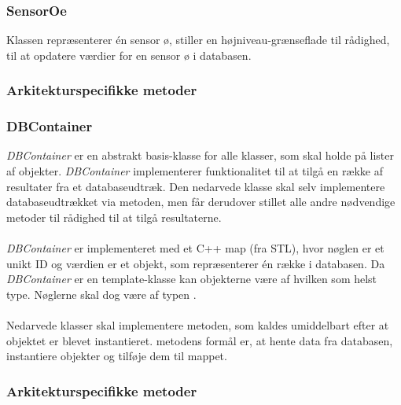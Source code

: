 \subsubsection{SensorOe}
Klassen repræsenterer én sensor ø, stiller en højniveau-grænseflade til rådighed, til at opdatere værdier for en sensor ø i databasen.

\subsubsection{Arkitekturspecifikke metoder}

{
}

{
}



\subsubsection{DBContainer}
\textit{DBContainer} er en abstrakt basis-klasse for alle klasser, som skal holde på lister af objekter. \textit{DBContainer} implementerer funktionalitet til at tilgå en række af resultater fra et databaseudtræk. Den nedarvede klasse skal selv implementere databaseudtrækket via  metoden, men får derudover stillet alle andre nødvendige metoder til rådighed til at tilgå resultaterne.\\\\

\textit{DBContainer} er implementeret med et C++ map (fra STL), hvor nøglen er et unikt ID og værdien er et objekt, som repræsenterer én række i databasen. Da \textit{DBContainer} er en template-klasse kan objekterne være af hvilken som helst type. Nøglerne skal dog være af typen .\\\\

Nedarvede klasser skal implementere  metoden, som kaldes umiddelbart efter at objektet er blevet instantieret.  metodens formål er, at hente data fra databasen, instantiere objekter og tilføje dem til mappet.

\subsubsection{Arkitekturspecifikke metoder}

